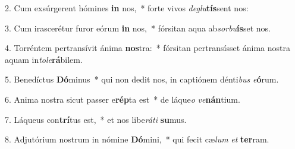 2. Cum exsúrgerent hómines \textbf{in} nos,~*  forte vivos \textit{de}\textit{glu}\textbf{tís}sent nos:\

3. Cum irascerétur furor eórum \textbf{in} nos,~*  fórsitan aqua ab\textit{sor}\textit{bu}\textbf{ís}set nos.\

4. Torréntem pertransívit ánima \textbf{nos}tra:~*  fórsitan pertransísset ánima nostra aquam in\textit{to}\textit{le}\textbf{rá}bilem.\

5. Benedíctus \textbf{Dó}minus~*  qui non dedit nos, in captiónem dénti\textit{bus} \textit{e}\textbf{ó}rum.\

6. Anima nostra sicut passer e\textbf{rép}ta est~*  de láque\textit{o} \textit{ve}\textbf{nán}tium.\

7. Láqueus con\textbf{trí}tus est,~*  et nos libe\textit{rá}\textit{ti} \textbf{su}mus.\

8. Adjutórium nostrum in nómine \textbf{Dó}mini,~*  qui fecit cæ\textit{lum} \textit{et} \textbf{ter}ram.\

